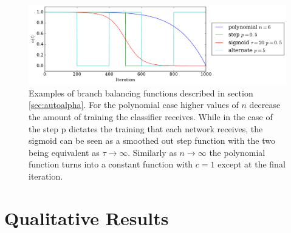     \begin{figure}[!h]
      \centering
      \includegraphics[width =\hsize]{figures/alpha.pdf}
      \caption{Examples of branch balancing functions described in section \ref{sec:autoalpha}.
      For the polynomial case higher values of $n$ decrease the amount of training
      the classifier receives. While in the case of the step p dictates the training
      that each network receives, the sigmoid can be seen as a smoothed out step function
      with the two being equivalent as $ \tau \rightarrow \infty$. Similarly as $n \rightarrow \infty$
      the polynomial function turns into a constant function with $c=1$ except at the final
      iteration.}
      \label{fig:alpha_functions}
    \end{figure}

  \section{Qualitative Results}
